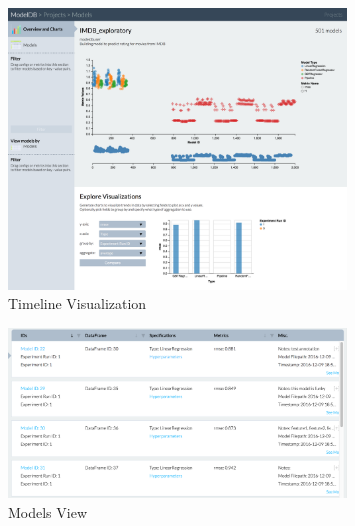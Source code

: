 \documentclass[11pt]{article}
\begin{document}
\begin{figure}
  \centering
  \includegraphics[trim=0mm 0mm 0mm 0mm,
  clip=true, width=0.8\textwidth]{figs/mdb_model_timeline.png}
  \caption{\label{fig:mdb_model_timeline} Timeline Visualization}
\end{figure}





\begin{figure}
  \centering
  \includegraphics[trim=0mm 0mm 0mm 0mm,
  clip=true, width=0.8\textwidth]{figs/mdb_tabular.png}
  \caption{\label{fig:tabular-view} Models View}
\end{figure}
\end{document}
